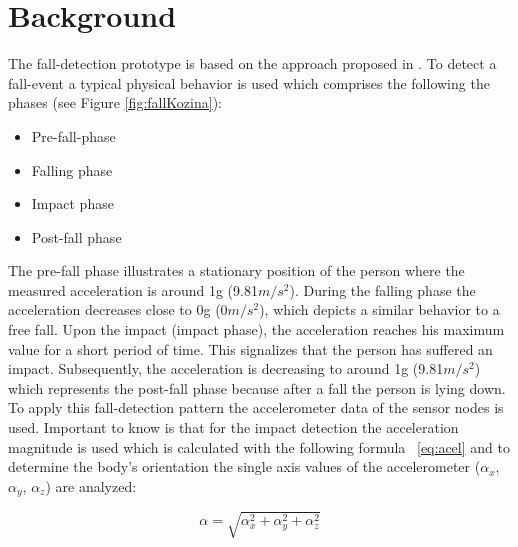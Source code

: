 \documentclass[review]{elsarticle}
\begin{document}
\section{Background}
\label{sec:background}
The fall-detection prototype is based on the approach proposed in \cite{Gjoreski2014, Kozina}. To detect a fall-event a typical physical behavior is used which comprises the following the phases (see Figure \ref{fig:fallKozina}):
\begin{itemize}
	\item Pre-fall-phase 
	\item Falling phase
	\item Impact phase
	\item Post-fall phase
\end{itemize}
The pre-fall phase illustrates a stationary position of the person where the measured acceleration is around 1g (9.81$m/s^{2}$). During the falling phase the  acceleration decreases close to 0g (0$m/s^{2}$), which depicts a similar behavior to a free fall. Upon the impact (impact phase), the acceleration reaches his maximum value for a short period of time. This signalizes that the person has suffered an impact. Subsequently, the acceleration is decreasing to around 1g (9.81$m/s^{2}$) which represents the post-fall phase because after a fall the person is lying down. To apply this fall-detection pattern the accelerometer data of the sensor nodes is used. Important to know is that for the impact detection the acceleration magnitude is used which is calculated with the following formula ~\ref{eq:acel} and to determine the body's orientation the single axis values of the accelerometer ($\alpha_x$, $\alpha_y$, $\alpha_z$) are analyzed:

\begin{equation}\label{eq:acel}
\alpha = \sqrt{\alpha_{x}^{2} + \alpha_{y}^{2} + \alpha_{z}^{2}}
\end{equation}
\end{document}
